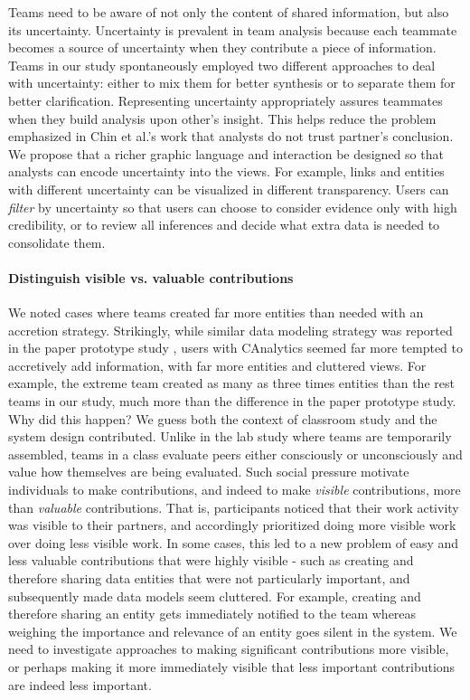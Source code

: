 Teams need to be aware of not only the content of shared information, but also
its uncertainty. Uncertainty is prevalent in team analysis because each teammate becomes a source of uncertainty when they contribute a piece of information. Teams in our study spontaneously employed two different approaches to
deal with uncertainty: either to mix them for better synthesis or to
separate them for better clarification. Representing uncertainty appropriately assures teammates when they build analysis upon other's insight. This helps reduce the problem emphasized in Chin et al.'s work \cite{Chin2009} that analysts do not trust partner's conclusion. We propose that a richer graphic
language and interaction be designed so that analysts can encode uncertainty
into the views. For example, links and entities with different
uncertainty can be visualized in different transparency. Users can \emph{filter}
by uncertainty so that users can choose to consider evidence only with high credibility, or to review
all inferences and decide what extra data is needed to consolidate them.

\paragraph{Distinguish visible vs. valuable contributions}

We noted cases where teams created far more entities than needed
with an accretion strategy.
Strikingly, while similar data modeling strategy was reported in the paper prototype
study \cite{Carroll2013}, users with CAnalytics seemed far more
tempted to accretively add information, with far more entities and
cluttered views. For example, the extreme team created as many as three times entities than the rest teams in our study, much more than the difference in the paper prototype study. Why did this
happen? We guess both the context of classroom study and the system
design contributed. Unlike in the lab study where teams are temporarily
assembled, teams in a class evaluate peers either consciously or
unconsciously and value how themselves are being evaluated. Such social
pressure motivate individuals to make contributions, and indeed to make
\emph{visible} contributions, more than \emph{valuable} contributions. That is,
participants noticed that their work activity was visible to their
partners, and accordingly prioritized doing more visible work over doing
less visible work. In some cases, this led to a new problem of easy and
less valuable contributions that were highly visible - such as creating
and therefore sharing data entities that were not particularly
important, and subsequently made data models seem cluttered. For
example, creating and therefore sharing an entity gets immediately
notified to the team whereas weighing the importance and relevance of an
entity goes silent in the system. We need to investigate approaches to
making significant contributions more visible, or perhaps making it more
immediately visible that less important contributions are indeed less
important.

